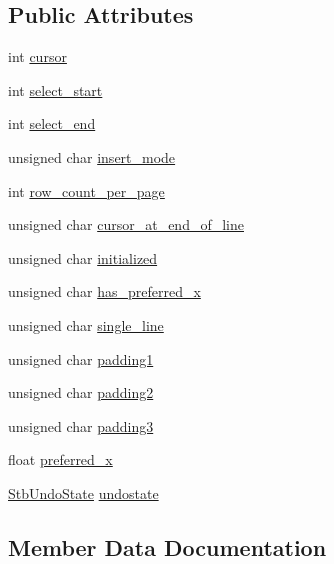 \subsection*{Public Attributes}
\begin{DoxyCompactItemize}
\item 
int \hyperlink{structImStb_1_1STB__TexteditState_aec3b0c9e6fa6fb91bee469cfc10aef65}{cursor}
\item 
int \hyperlink{structImStb_1_1STB__TexteditState_aae5cbd9648e23335e09b002ab48f49f3}{select\+\_\+start}
\item 
int \hyperlink{structImStb_1_1STB__TexteditState_a7490ab6fb3b63ab03a2430a909e2705a}{select\+\_\+end}
\item 
unsigned char \hyperlink{structImStb_1_1STB__TexteditState_ae5f58ce12de3ac6d3f295860e4752a67}{insert\+\_\+mode}
\item 
int \hyperlink{structImStb_1_1STB__TexteditState_a2c995c3872cbe275661fc614a13275db}{row\+\_\+count\+\_\+per\+\_\+page}
\item 
unsigned char \hyperlink{structImStb_1_1STB__TexteditState_a7e02ff5067c92fb3360bfe6aba42020c}{cursor\+\_\+at\+\_\+end\+\_\+of\+\_\+line}
\item 
unsigned char \hyperlink{structImStb_1_1STB__TexteditState_ad655cc7f2ecf4ceecd42e720d61d9362}{initialized}
\item 
unsigned char \hyperlink{structImStb_1_1STB__TexteditState_a010e22d89fd4cf5c84852f52b793fa7d}{has\+\_\+preferred\+\_\+x}
\item 
unsigned char \hyperlink{structImStb_1_1STB__TexteditState_a185db6b877a3cf5435afe326a5d87b0b}{single\+\_\+line}
\item 
unsigned char \hyperlink{structImStb_1_1STB__TexteditState_aa1081d10222ab4c81cc4705e60c68769}{padding1}
\item 
unsigned char \hyperlink{structImStb_1_1STB__TexteditState_a44a4594d7e1d9956ef2565a57db51b33}{padding2}
\item 
unsigned char \hyperlink{structImStb_1_1STB__TexteditState_a34bc85d7c53b0b138dec9d2221848257}{padding3}
\item 
float \hyperlink{structImStb_1_1STB__TexteditState_a7c252328de4797d8f0102dabfd71f87a}{preferred\+\_\+x}
\item 
\hyperlink{structImStb_1_1StbUndoState}{Stb\+Undo\+State} \hyperlink{structImStb_1_1STB__TexteditState_a46ad65e4289762da51bd7d6d2716842f}{undostate}
\end{DoxyCompactItemize}


\subsection{Member Data Documentation}
\mbox{\label{structImStb_1_1STB__TexteditState_aec3b0c9e6fa6fb91bee469cfc10aef65}} 
